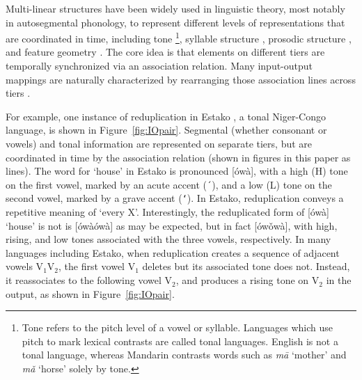 \documentclass[pmlr]{jmlr}%
\begin{document}
	Multi-linear structures have been widely used in linguistic
	theory, most notably in autosegmental phonology, to represent
	different levels of representations that are coordinated in time,
	including tone \footnote{Tone
		refers to the pitch level of a vowel or syllable.
		Languages which use pitch to mark lexical contrasts are called tonal languages.
		English is not a tonal language, whereas Mandarin contrasts words such as
		\textit{mā} `mother' and \textit{mǎ} `horse' solely by tone.}\citep{goldsmith1976autosegmental}, syllable structure \citep{ck83},
	prosodic structure \citep{hayes1980metrical}, and
	feature geometry \citep{sagey1986representation}.
	The core idea is that elements on different tiers are temporally synchronized via
	an association relation. Many input-output mappings are
	naturally characterized by rearranging those association lines across
	tiers \citep{goldsmith1976autosegmental,CG1984autosegmental, hyman2009representation}.
	
	For example, one instance of reduplication in Estako \citep{elimelech1976tonal}, a tonal Niger-Congo language, is shown in Figure~\ref{fig:IOpair}.
	Segmental (whether consonant or vowels) and tonal information are represented on separate tiers, but are coordinated in time by the association relation (shown in figures in this paper as lines).
	The word for ‘house’ in Estako is pronounced [ówà], with a high (H) tone on the first 
	vowel, marked by an acute accent (\texttt{´}), and a low (L) tone on 
	the second vowel, marked by a grave accent (\texttt{`}).
	In Estako, reduplication conveys a repetitive meaning of ‘every X’. 
	Interestingly, the reduplicated form of [ówà] ‘house’ is not is [ówàówà] as may be expected, but in fact [ówǒwà],
	with high, rising, and low tones associated with the three vowels, respectively. In many languages including Estako, when reduplication creates a sequence of
	adjacent vowels V\(_1\)V\(_2\), the first vowel V\(_1\) deletes but its
	associated tone does not. Instead, it reassociates to the following vowel V\(_2\), and 
	produces a rising tone on V\(_2\) in the output, as shown in Figure~\ref{fig:IOpair}.
	
	
\end{document}
